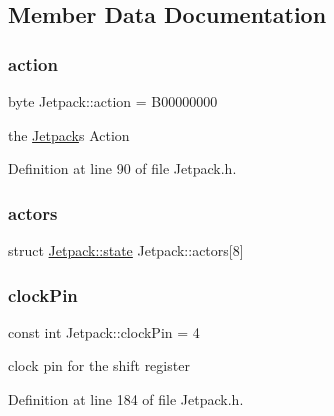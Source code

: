 \subsection{Member Data Documentation}
\mbox{\label{class_jetpack_aca3142925a7b0834b34ae91d26af7765}} 
\subsubsection{\texorpdfstring{action}{action}}
{\footnotesize\ttfamily byte Jetpack\+::action = B00000000\hspace{0.3cm}{\ttfamily [private]}}

the \hyperlink{class_jetpack}{Jetpack}\textquotesingle{}s Action 

Definition at line 90 of file Jetpack.\+h.

\mbox{\label{class_jetpack_a7e16d2f97837f9712a2e6de1c50d99db}} 
\subsubsection{\texorpdfstring{actors}{actors}}
{\footnotesize\ttfamily struct \hyperlink{struct_jetpack_1_1state}{Jetpack\+::state} Jetpack\+::actors\mbox{[}8\mbox{]}\hspace{0.3cm}{\ttfamily [private]}}

\mbox{\label{class_jetpack_a58ebb991f358f3ae94e82148b0221b5a}} 
\subsubsection{\texorpdfstring{clock\+Pin}{clockPin}}
{\footnotesize\ttfamily const int Jetpack\+::clock\+Pin = 4\hspace{0.3cm}{\ttfamily [private]}}

clock pin for the shift register 

Definition at line 184 of file Jetpack.\+h.

\mbox{\label{class_jetpack_a3d669a56e93c71dd25f970d4ed7d0c00}} 
